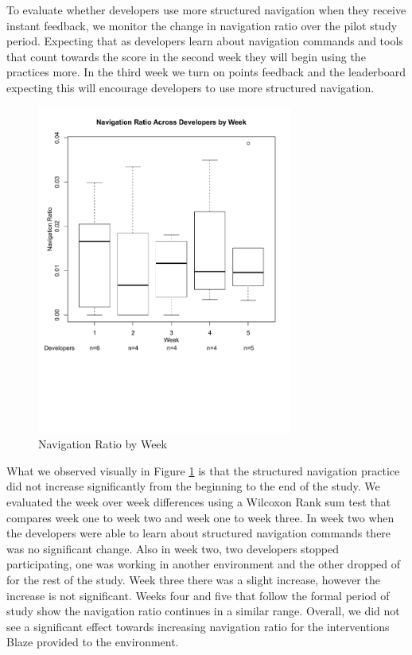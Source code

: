 \documentclass{sig-alternate}
\begin{document}
To evaluate whether developers use more structured navigation when they receive instant feedback, we monitor the change in navigation ratio over the pilot study period.   Expecting that as developers learn about navigation commands and tools that count towards the score in the second week they will begin using the practices more.  In the third week we turn on points feedback and the leaderboard expecting this will encourage developers to use more structured navigation.  

\begin{figure}
	\includegraphics[width=3.3in]{navratioboxplot_ann.pdf}
	\caption{Navigation Ratio by Week}
	\label{fig:navigationaverage}
\end{figure}

What we observed visually in Figure \ref{fig:navigationaverage} is that the structured navigation practice did not increase significantly from the beginning to the end of the study.  We evaluated the week over week differences using a Wilcoxon Rank sum test that compares week one to week two and week one to week three.    In week two when the developers were able to learn about structured navigation commands there was no significant change.  Also in week two, two developers stopped participating, one was working in another environment and the other dropped of for the rest of the study.  Week three there was a slight increase, however the increase is not significant.  Weeks four and five that follow the formal period of study show the navigation ratio continues in a similar range.  Overall, we did not see a significant effect towards increasing navigation ratio for the interventions Blaze provided to the environment. 
\end{document}
